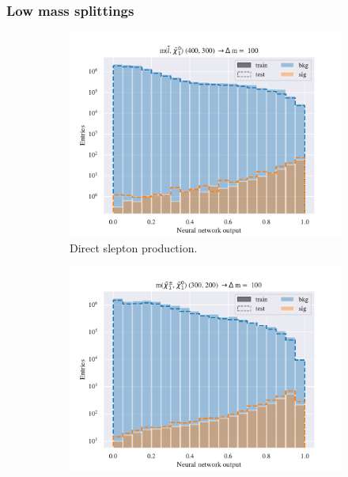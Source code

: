 \subsubsection{Low mass splittings}
\begin{figure}[H]
    \centering
    \begin{subfigure}[t!]{0.49\textwidth}
        \includegraphics[width = \textwidth]{Figures/SlepSlep/ML/NN/Low_level/Low/scaled_train_test_395984.pdf}
        \caption{Direct slepton production.}
        \label{fig:SlepslepNNLow}
    \end{subfigure}
    \begin{subfigure}[t!]{0.49\textwidth}
        \includegraphics[width = \textwidth]{Figures/SlepSnu/NN/Low_level/Low/scaled_train_test_397115.pdf}

\end{subfigure}
\end{figure}
